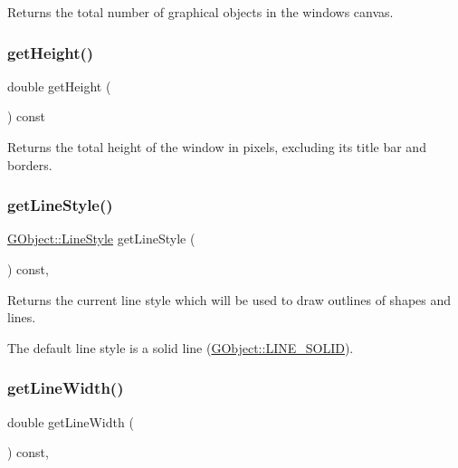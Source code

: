 Returns the total number of graphical objects in the window\textquotesingle{}s canvas. 

\mbox{\label{classGWindow_a1e7e353362434072875264cf95629f99}} 
\subsubsection{\texorpdfstring{get\+Height()}{getHeight()}}
{\footnotesize\ttfamily double get\+Height (\begin{DoxyParamCaption}{ }\end{DoxyParamCaption}) const\hspace{0.3cm}{\ttfamily [virtual]}}



Returns the total height of the window in pixels, excluding its title bar and borders. 

\mbox{\label{classGDrawingSurface_aaf1f5ea8281e5e3486662878d26f0a13}} 
\subsubsection{\texorpdfstring{get\+Line\+Style()}{getLineStyle()}}
{\footnotesize\ttfamily \mbox{\hyperlink{classGObject_a86e0f5648542856159bb40775c854aa7}{G\+Object\+::\+Line\+Style}} get\+Line\+Style (\begin{DoxyParamCaption}{ }\end{DoxyParamCaption}) const\hspace{0.3cm}{\ttfamily [virtual]}, {\ttfamily [inherited]}}



Returns the current line style which will be used to draw outlines of shapes and lines. 

The default line style is a solid line (\mbox{\hyperlink{classGObject_a86e0f5648542856159bb40775c854aa7a700c78bc2cd76acaab26651bf7b4941f}{G\+Object\+::\+L\+I\+N\+E\+\_\+\+S\+O\+L\+ID}}). \mbox{\label{classGDrawingSurface_a85ff266dc3eb63d9f2d8e5a4487fd3c0}} 
\subsubsection{\texorpdfstring{get\+Line\+Width()}{getLineWidth()}}
{\footnotesize\ttfamily double get\+Line\+Width (\begin{DoxyParamCaption}{ }\end{DoxyParamCaption}) const\hspace{0.3cm}{\ttfamily [virtual]}, {\ttfamily [inherited]}}



